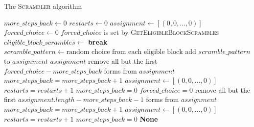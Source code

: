 \documentclass[11pt]{article}
\begin{document}
\begingroup\singlespacing
\begin{algorithm}
  \caption{The \textsc{Scrambler} algorithm}
  \label{alg:scramble}
  \begin{algorithmic}
   
    \State
    $\mathit{more\_steps\_back} \gets 0$ \State
    $\mathit{restarts} \gets 0$ \State
    $\mathit{assignment} \gets [(0, 0, \dots ,0)]$ \State
    $\mathit{forced\_choice} \gets 0$ \Comment
    $\mathit{forced\_choice}$ is set by
    \textsc{GetEligibleBlockScrambles}
      \State
    $\mathit{eligible\_block\_scrambles} \gets$
    \textbf{break}\Else \State
    $\mathit{scramble\_pattern} \gets \text{random choice from each
      eligible block}$
    \EndIf
     \State add
    $\mathit{scramble\_pattern}$ to $\mathit{assignment}$
    \EndIf {} \State \Return
    $\mathit{assignment}$ \EndIf
    \EndFor
    \State remove all but the first
    $\mathit{forced\_choice} - \mathit{more\_steps\_back}$ forms from
    $\mathit{assignment}$ \State
    $\mathit{more\_steps\_back} = \mathit{more\_steps\_back} + 1$
    \Else\State $\mathit{assignment} \gets [(0, 0, \dots ,0)]$ \State
    $\mathit{restarts} = \mathit{restarts} + 1$ \State
    $\mathit{more\_steps\_back} = 0$
    \EndIf\State
    $\mathit{forced\_choice} = 0$
    \State remove all but the first
    $\mathit{assignment.length} - \mathit{more\_steps\_back} - 1$
    forms from $\mathit{assignment}$ \State
    $\mathit{more\_steps\_back} = \mathit{more\_steps\_back} + 1$
    \Else \State $\mathit{assignment} \gets [(0, 0, \dots ,0)]$ \State
    $\mathit{restarts} = \mathit{restarts} + 1$ \State
    $\mathit{more\_steps\_back} = 0$
    \EndIf
    \EndWhile \State \Return \textbf{None}
    \EndFunction
  \end{algorithmic}
\end{algorithm}
\endgroup
\end{document}

